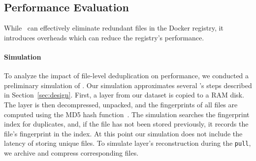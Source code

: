 \subsection{Performance Evaluation}

While \sysname\ can effectively eliminate redundant files in the
Docker registry, it introduces overheads which can reduce the
registry's performance.
%



\paragraph{Simulation}
%
To analyze the impact of file-level deduplication on performance,
we conducted a preliminary simulation of \sysname.
%
%
%
%
%
Our simulation
approximates several \sysname's steps described in Section~\ref{sec:design}.
%
First, a layer from our dataset is copied to a RAM disk. 
%
%
%
The layer is then decompressed, unpacked, and the fingerprints of all files
are computed using the MD5 hash function~\cite{MD5}.
%
The simulation searches the fingerprint index for duplicates,
and, if the file has not been stored previously, it records the
file's fingerprint in the index.
%
%
%
%
%
At this point our simulation does not include
the latency of storing unique files.
%
To simulate layer's reconstruction during the \texttt{pull},
we archive and compress corresponding files.
%
%


